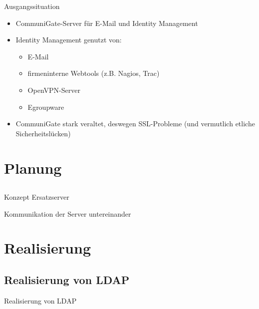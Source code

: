 \documentclass[handout,svgnames]{beamer}
\begin{document}
\begin{frame}{Ausgangssituation}
\begin{itemize}
	\item CommuniGate-Server für E-Mail und Identity Management
	\item Identity Management genutzt von:
	\begin{itemize}
		\item E-Mail
		\item firmeninterne Webtools (z.B. Nagios, Trac)
		\item OpenVPN-Server
		\item Egroupware
	\end{itemize}
	\item CommuniGate stark veraltet, deswegen SSL-Probleme (und vermutlich etliche Sicherheitslücken)
\end{itemize}
\end{frame}


\section{Planung}
\subsection{}
\begin{frame}{Konzept Ersatzserver}

\end{frame}


\begin{frame}{Kommunikation der Server untereinander}

\end{frame}


\section{Realisierung}
\subsection{Realisierung von LDAP}
\begin{frame}{Realisierung von LDAP}
\end{frame}
\end{document}
